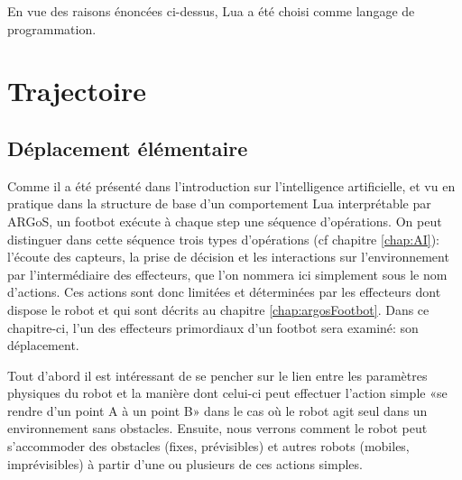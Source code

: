 \documentclass[a4paper]{report}
\begin{document}
En vue des raisons énoncées ci-dessus, Lua a été choisi comme langage de programmation. 

\chapter{Trajectoire}

\section{Déplacement élémentaire}

Comme il a été présenté dans l'introduction sur l'intelligence artificielle, et vu en pratique dans la structure de base d'un comportement Lua interprétable par ARGoS, un footbot exécute à chaque step une séquence d'opérations. On peut distinguer dans cette séquence trois types d'opérations (cf chapitre \ref{chap:AI}): l'écoute des capteurs, la prise de décision et les interactions sur l'environnement par l'intermédiaire des effecteurs, que l'on nommera ici simplement sous le nom d'actions. Ces actions sont donc limitées et déterminées par les effecteurs dont dispose le robot et qui sont décrits au chapitre \ref{chap:argosFootbot}. Dans ce chapitre-ci, l'un des effecteurs primordiaux d'un footbot sera examiné: son déplacement.

Tout d'abord il est intéressant de se pencher sur le lien entre les paramètres physiques du robot et la manière dont celui-ci peut effectuer l'action simple «se rendre d'un point A à un point B» dans le cas où le robot agit seul dans un environnement sans obstacles. Ensuite, nous verrons comment le robot peut s’accommoder des obstacles (fixes, prévisibles) et autres robots (mobiles, imprévisibles) à partir d'une ou plusieurs de ces actions simples.
\end{document}
